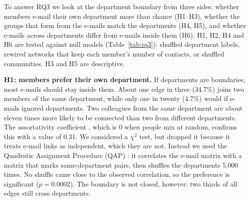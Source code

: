 To answer RQ3 we look at the department boundary from three sides: whether
members e-mail their own department more than chance (H1--H3), whether the
groups that form from the e-mails match the departments (H4, H5), and whether
e-mails across departments differ from e-mails inside them (H6). H1, H2, H4
and H6 are tested against null models (Table~\ref{tab:rq3}): shuffled
department labels, rewired networks that keep each member's number of contacts,
or shuffled communities. H3 and H5 are descriptive.

\textbf{H1: members prefer their own department.} If departments are
boundaries, most e-mails should stay inside them. About one edge in three
(34.7\%) joins two members of the same department, while only one in twenty
(4.7\%) would if e-mails ignored departments. Two colleagues
from the same department are about eleven times more likely to be connected
than two from different departments. The assortativity coefficient
\cite{newman2003}, which is 0 when people mix at random, confirms this with a
value of 0.31. We considered a $\chi^2$ test, but dropped it because it
treats e-mail links as independent, which they are not. Instead we used the
Quadratic Assignment Procedure (QAP) \cite{krackhardt1988}: it correlates the e-mail matrix with a matrix that marks
same-department pairs, then shuffles the departments 5{,}000 times. No shuffle
came close to the observed correlation, so the preference is significant
($p=0.0002$). The boundary is not closed, however: two thirds of all edges
still cross departments.

